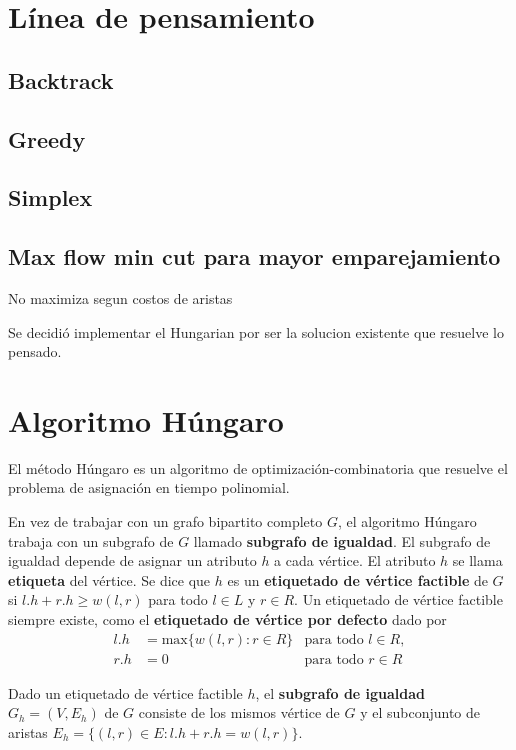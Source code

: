\documentclass[10pt]{article} %
\begin{document}
	\section{L\'inea de pensamiento}
	\subsection{Backtrack}
	\subsection{Greedy}
	\subsection{Simplex}
	\subsection{Max flow min cut para mayor emparejamiento}
	No maximiza segun costos de aristas
	
	Se decidi\'o implementar el Hungarian por ser la solucion existente que resuelve lo pensado. 
	
	
	
	
 
	\section{Algoritmo H\'ungaro}
	
	El método Húngaro es un algoritmo de optimización-combinatoria que resuelve el problema de asignación en tiempo polinomial.
	
	En vez de trabajar con un grafo bipartito completo $G$, el algoritmo H\'ungaro trabaja con un subgrafo de $G$ llamado \textbf{subgrafo de igualdad}. El subgrafo de igualdad depende de asignar un atributo $h$ a cada v\'ertice. El atributo $h$ se llama \textbf{etiqueta} del v\'ertice. Se dice que $h$ es un \textbf{etiquetado de vértice factible} de $G$ si $l.h + r.h \geq w(l,r)$ para todo $l \in L$ y $r \in R$. Un etiquetado de v\'ertice factible siempre existe, como el \textbf{etiquetado de v\'ertice por defecto} dado por
	\begin{align}
		\label{eq:defecto}
		l.h &= \text{max} \{w(l,r):r \in R\} &\text{para todo } l \in R,\\
		r.h &= 0 &\text{para todo } r \in R 
	\end{align}

	Dado un etiquetado de v\'ertice factible $h$, el \textbf{subgrafo de igualdad} $G_h = (V, E_h)$ de $G$ consiste de los mismos v\'ertice de $G$ y el subconjunto de aristas $E_h = \{(l,r) \in E: l.h + r.h = w(l,r)\}$.
	
\end{document}
